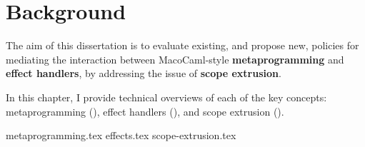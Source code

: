 
\chapter{Background}
The aim of this dissertation is to evaluate existing, and propose new, policies for mediating the interaction between MacoCaml-style \textbf{metaprogramming} and \textbf{effect handlers}, by addressing the issue of \textbf{scope extrusion}.

In this chapter, I provide technical overviews of each of the key concepts: metaprogramming (), effect handlers (), and scope extrusion ().

{metaprogramming.tex}
{effects.tex}
{scope-extrusion.tex}
